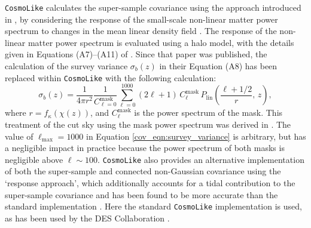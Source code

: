 \texttt{CosmoLike} calculates the super-sample covariance using the approach introduced in \citet{Takada2013}, by considering the response of the small-scale non-linear matter power spectrum to changes in the mean linear density field \citep[see also][]{Chiang2014,Li2014}. The response of the non-linear matter power spectrum is evaluated using a halo model, with the details given in Equations (A7)--(A11) of \citet{Krause2017CosmoLike}. Since that paper was published, the calculation of the survey variance $\sigma_b (z)$ in their Equation (A8) has been replaced within \texttt{CosmoLike} with the following calculation:
\begin{equation}
\sigma_b \left( z \right) = \frac{1}{4 \pi r^2}
\frac{1}{C_{\ell = 0}^\text{mask}}
\sum_{\ell = 0}^{1000}
\left( 2 \ell + 1 \right) \, C_\ell^\text{mask} \,
P_\text{lin} \left( \frac{\ell + 1/2}{r}, \, z \right),
\label{cov_eqn:survey_variance}
\end{equation}
where $r = f_\kappa \left( \chi \left( z \right) \right)$, and $C_\ell^\text{mask}$ is the power spectrum of the mask.
This treatment of the cut sky using the mask power spectrum was derived in \citet{Barreira2018ssc}.
The value of $\ell_\text{max} = 1000$ in Equation \eqref{cov_eqn:survey_variance} is arbitrary, but has a negligible impact in practice because the power spectrum of both masks is negligible above $\ell \sim 100$.
\texttt{CosmoLike} also provides an alternative implementation of both the super-sample and connected non-Gaussian covariance using the `response approach', which additionally accounts for a tidal contribution to the super-sample covariance and has been found to be more accurate than the standard implementation \citep{Wagner2015, Barreira2017a, Barreira2017b, Barreira2018ssc, Schmidt2018}. Here the standard \texttt{CosmoLike} implementation is used, as has been used by the DES Collaboration \citep{Krause2017, Krause2021, Friedrich2021, Camacho2021}.

